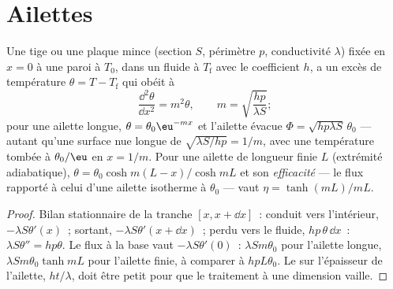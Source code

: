 \section{Ailettes}

\begin{proposition}\label{prop:b2:heat-conduction:fin}
Une tige ou une plaque mince (section $S$, périmètre $p$, conductivité $\lambda$)
fixée en $x = 0$ à une paroi à $T_0$, dans un fluide à $T_{\text{f}}$ avec
le coefficient $h$, a un excès de température $\theta = T - T_{\text{f}}$
qui obéit à
\[
\frac{\dd^2\theta}{\dd x^2} = m^2\theta, \qquad m = \sqrt{\frac{hp}{\lambda S}} ;
\]
pour une ailette longue, $\theta = \theta_0\eu^{-mx}$ et l'ailette évacue $\Phi =
\sqrt{hp\lambda S}\,\theta_0$ --- autant qu'une surface nue longue de $\sqrt{\lambda
S/hp} = 1/m$, avec une température tombée à $\theta_0/\eu$ en
$x = 1/m$. Pour une ailette de longueur finie $L$ (extrémité adiabatique), $\theta =
\theta_0\cosh m(L-x)/\cosh mL$ et son \emph{efficacité} --- le flux rapporté à celui d'une ailette isotherme à $\theta_0$ ---
vaut $\eta = \tanh(mL)/mL$.
\end{proposition}

\begin{proof}
Bilan stationnaire de la tranche $[x, x + \dd x]$~: conduit vers l'intérieur,
$-\lambda S\theta'(x)$~; sortant, $-\lambda S\theta'(x + \dd x)$~; perdu vers le
fluide, $hp\,\theta\,\dd x$~: $\lambda S\theta'' = hp\theta$. Le flux à la
base vaut $-\lambda S\theta'(0)$~: $\lambda Sm\theta_0$ pour l'ailette longue,
$\lambda Sm\theta_0\tanh mL$ pour l'ailette finie, à comparer à
$hpL\theta_0$. Le  sur l'épaisseur de l'ailette, $ht/\lambda$, doit
être petit pour que le traitement à une dimension vaille.
\end{proof}

